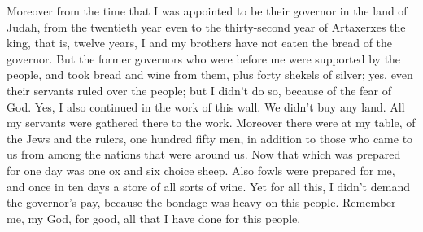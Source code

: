 {\par }{\PP {}Moreover from the time that I was appointed to be their governor in the land of Judah, from the twentieth year even to the thirty-second year of Artaxerxes the king, that is, twelve years, I and my brothers have not eaten the bread of the governor.
But the former governors who were before me were supported by the people, and took bread and wine from them, plus forty shekels of silver; yes, even their servants ruled over the people; but I didn’t do so, because of the fear of God.
Yes, I also continued in the work of this wall. We didn’t buy any land. All my servants were gathered there to the work.
Moreover there were at my table, of the Jews and the rulers, one hundred fifty men, in addition to those who came to us from among the nations that were around us.
Now that which was prepared for one day was one ox and six choice sheep. Also fowls were prepared for me, and once in ten days a store of all sorts of wine. Yet for all this, I didn’t demand the governor’s pay, because the bondage was heavy on this people.
Remember me, my God, for good, all that I have done for this people.

}
